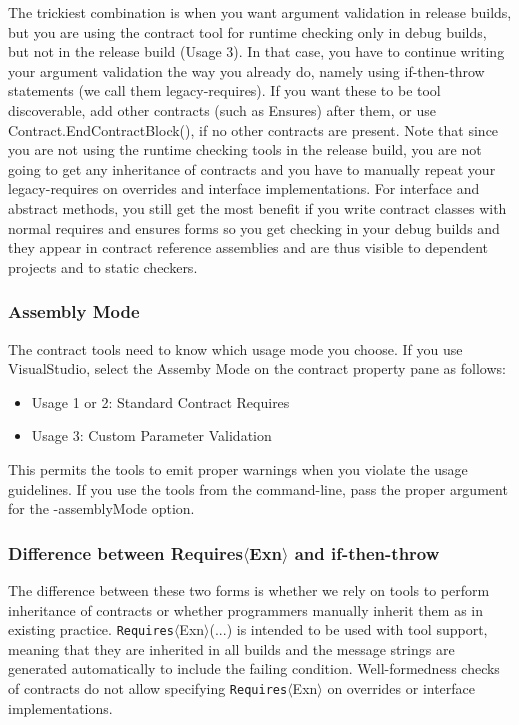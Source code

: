 \documentclass{article}
\newcommand{\code}[1]{\lstinline{#1}}
\newcommand{\requires}[1]{\code{Requires}$\langle$#1$\rangle$}
\newcommand{\requiresn}[1]{{Requires}$\langle$#1$\rangle$}
\begin{document}
The trickiest combination is when you want argument validation in
release builds, but you are using the contract tool for runtime
checking only in debug builds, but not in the release build (Usage
3). In that case, you have to continue writing your argument
validation the way you already do, namely using if-then-throw
statements (we call them legacy-requires). If you want these to be
tool discoverable, add other contracts (such as Ensures) after them,
or use Contract.EndContractBlock(), if no other contracts are
present. Note that since you are not using the runtime checking tools
in the release build, you are not going to get any inheritance of
contracts and you have to manually repeat your legacy-requires on
overrides and interface implementations. For interface and abstract
methods, you still get the most benefit if you write contract classes
with normal requires and ensures forms so you get checking in your
debug builds and they appear in contract reference assemblies and are
thus visible to dependent projects and to static checkers.

\subsubsection{Assembly Mode}
\label{sec:assemblymode}
The contract tools need to know which usage mode you choose. If you
use VisualStudio, select the \textsf{Assemby Mode} on the contract
property pane as follows:
\begin{itemize}
\item Usage 1 or 2: Standard Contract Requires
\item Usage 3: Custom Parameter Validation
\end{itemize}
This permits the tools to emit proper warnings when you violate the
usage guidelines.
If you use the tools from the command-line, pass the proper argument
for the \textsf{-assemblyMode} option.

\subsubsection{Difference between \requiresn{Exn} and if-then-throw}
The difference between these two forms is whether we rely on tools to
perform inheritance of contracts or whether programmers manually
inherit them as in existing practice. \requires{Exn}(...) is intended to
be used with tool support, meaning that they are inherited in all
builds and the message strings are generated automatically to include
the failing condition. Well-formedness checks of contracts do not
allow specifying \requires{Exn} on overrides or interface
implementations.
\end{document}
